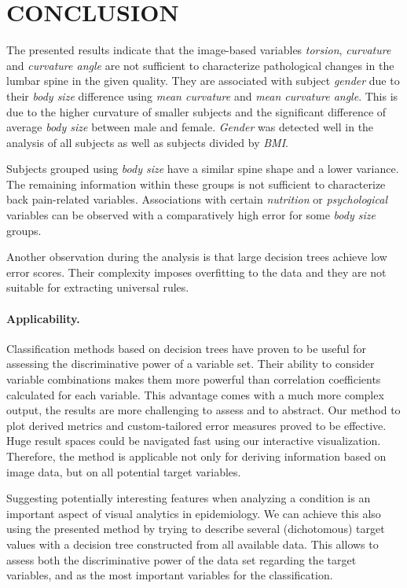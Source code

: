 \documentclass[a4paper,twoside]{style/article}
\begin{document}
\section{\uppercase{Conclusion}}
\label{sec:Conclusion}
\noindent The presented results indicate that the image-based variables \emph{torsion}, \emph{curvature} and \emph{curvature angle} are not sufficient to characterize pathological changes in the lumbar spine in the given quality.
They are associated with subject \emph{gender} due to their \emph{body size} difference using \emph{mean curvature} and \emph{mean curvature angle}.
This is due to the higher curvature of smaller subjects and the significant difference of average \emph{body size} between male and female.
\emph{Gender} was detected well in the analysis of all subjects as well as subjects divided by \emph{BMI}.

Subjects grouped using \emph{body size} have a similar spine shape and a lower variance.
The remaining information within these groups is not sufficient to characterize back pain-related variables.
Associations with certain \emph{nutrition} or \emph{psychological} variables can be observed with a comparatively high error for some \emph{body size} groups.

Another observation during the analysis is that large decision trees achieve low error scores.
Their complexity imposes overfitting to the data and they are not suitable for extracting universal rules.
\paragraph{Applicability.}
Classification methods based on decision trees have proven to be useful for assessing the discriminative power of a variable set.
Their ability to consider variable combinations makes them more powerful than correlation coefficients calculated for each variable.
This advantage comes with a much more complex output, the results are more challenging to assess and to abstract.
Our method to plot derived metrics and custom-tailored error measures proved to be effective.
Huge result spaces could be navigated fast using our interactive visualization.
Therefore, the method is applicable not only for deriving information based on image data, but on all potential target variables.

Suggesting potentially interesting features when analyzing a condition is an important aspect of visual analytics in epidemiology.
We can achieve this also using the presented method by trying to describe several (dichotomous) target values with a decision tree constructed from all available data.
This allows to assess both the discriminative power of the data set regarding the target variables, and as the most important variables for the classification.
\end{document}
